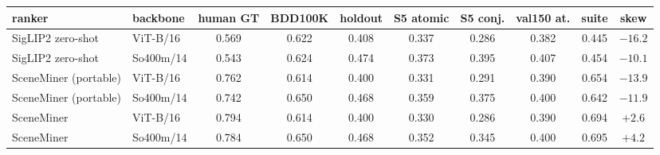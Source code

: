 \begin{tabular}{llcccccccc}
\toprule
ranker & backbone & human GT & BDD100K & holdout & S5 atomic & S5 conj. & val150 at. & suite & skew\\
\midrule
SigLIP2 zero-shot & ViT-B/16 & 0.569 & 0.622 & 0.408 & 0.337 & 0.286 & 0.382 & 0.445 & $-16.2$\\
SigLIP2 zero-shot & So400m/14 & 0.543 & 0.624 & 0.474 & 0.373 & 0.395 & 0.407 & 0.454 & $-10.1$\\
\midrule
SceneMiner (portable) & ViT-B/16 & 0.762 & 0.614 & 0.400 & 0.331 & 0.291 & 0.390 & 0.654 & $-13.9$\\
SceneMiner (portable) & So400m/14 & 0.742 & 0.650 & 0.468 & 0.359 & 0.375 & 0.400 & 0.642 & $-11.9$\\
\midrule
SceneMiner & ViT-B/16 & 0.794 & 0.614 & 0.400 & 0.330 & 0.286 & 0.390 & 0.694 & $+2.6$\\
SceneMiner & So400m/14 & 0.784 & 0.650 & 0.468 & 0.352 & 0.345 & 0.400 & 0.695 & $+4.2$\\
\bottomrule
\end{tabular}
